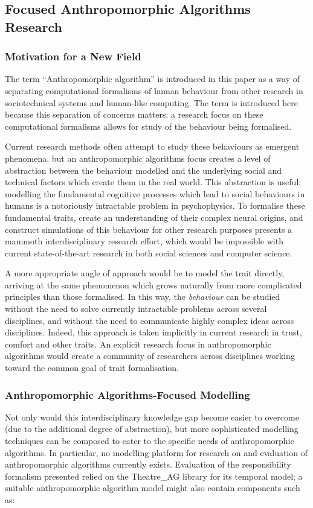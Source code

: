 \subsection{Focused Anthropomorphic Algorithms Research}
\subsubsection{Motivation for a New Field}
The term ``Anthropomorphic algorithm'' is introduced in this paper as a way of separating computational formalisms of human behaviour from other research in sociotechnical systems and human-like computing. The term is introduced here because this separation of concerns matters: a research focus on these computational formalisms allows for study of the behaviour being formalised.\par

Current research methods often attempt to study these behaviours as emergent phenomena, but an anthropomorphic algorithms focus creates a level of abstraction between the behaviour modelled and the underlying social and technical factors which create them in the real world. This abstraction is useful: modelling the fundamental cognitive processes which lead to social behaviours in humans is a notoriously intractable problem in psychophysics. To formalise these fundamental traits, create an understanding of their complex neural origins, and construct simulations of this behaviour for other research purposes presents a mammoth interdisciplinary research effort, which would be impossible with current state-of-the-art research in both social sciences and computer science.\par

A more appropriate angle of approach would be to model the trait directly, arriving at the same phenomenon which grows naturally from more complicated principles than those formalised. In this way, the \emph{behaviour} can be studied without the need to solve currently intractable problems across several disciplines, and without the need to communicate highly complex ideas across disciplines. Indeed, this approach is taken implicitly in current research in trust, comfort and other traits. An explicit research focus in anthropomorphic algorithms would create a community of researchers across disciplines working toward the common goal of trait formalisation.\par

\subsubsection{Anthropomorphic Algorithms-Focused Modelling}
Not only would this interdisciplinary knowledge gap become easier to overcome (due to the additional degree of abstraction), but more sophisticated modelling techniques can be composed to cater to the specific needs of anthropomorphic algorithms. In particular, no modelling platform for research on and evaluation of anthropomorphic algorithms currently exists. Evaluation of the responsibility formalism presented relied on the Theatre\_AG library for its temporal model; a suitable anthropomorphic algorithm model might also contain components such as:

